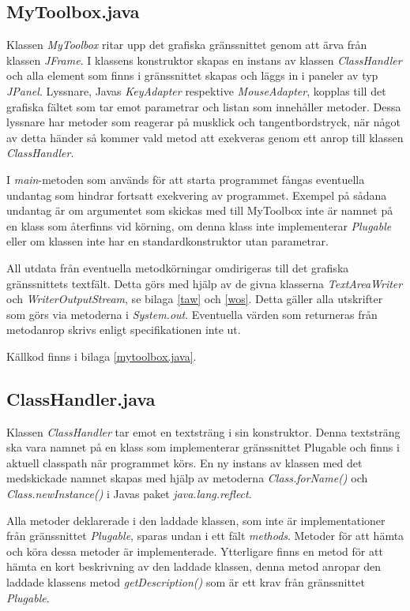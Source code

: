 \documentclass[a4paper, 12pt]{article}
\begin{document}
\subsection{MyToolbox.java}
Klassen \textit{MyToolbox} ritar upp det grafiska gränssnittet genom
att ärva från klassen \textit{JFrame}. I klassens konstruktor skapas
en instans av klassen \textit{ClassHandler} och alla element som finns
i gränssnittet skapas och läggs in i paneler av typ
\textit{JPanel}. Lyssnare, Javas \textit{KeyAdapter} respektive
\textit{MouseAdapter}, kopplas till det grafiska fältet som tar emot
parametrar och listan som innehåller metoder. Dessa lyssnare har
metoder som reagerar på musklick och tangentbordstryck, när något av
detta händer så kommer vald metod att exekveras genom ett anrop till
klassen \textit{ClassHandler}.

I \textit{main}-metoden som används för att starta programmet fångas
eventuella undantag som hindrar fortsatt exekvering av
programmet. Exempel på sådana undantag är om argumentet som skickas
med till MyToolbox inte är namnet på en klass som återfinns vid
körning, om denna klass inte implementerar \textit{Plugable} eller om
klassen inte har en standardkonstruktor utan parametrar.

All utdata från eventuella metodkörningar omdirigeras till det
grafiska gräns\-snittets textfält. Detta görs med hjälp av de givna
klasserna \textit{TextAreaWriter} och \textit{WriterOutputStream}, se
bilaga \ref{taw} och \ref{wos}. Detta gäller alla utskrifter som görs
via metoderna i \textit{System.out}. Eventuella värden som returneras
från metodanrop skrivs enligt specifikationen inte ut.

Källkod finns i bilaga \ref{mytoolbox.java}.

\subsection{ClassHandler.java}
Klassen \textit{ClassHandler} tar emot en textsträng i sin
konstruktor. Denna textsträng ska vara namnet på en klass som
implementerar gränssnittet Plugable och finns i aktuell classpath när
programmet körs. En ny instans av klassen med det medskickade namnet
skapas med hjälp av metoderna \textit{Class.forName()} och
\textit{Class.newInstance()} i Javas paket \textit{java.lang.reflect}.

Alla metoder deklarerade i den laddade klassen, som inte är
implementationer från gränssnittet \textit{Plugable}, sparas undan i ett
fält \textit{methods}. Metoder för att hämta och köra dessa metoder är
implementerade. Ytterligare finns en metod för att hämta en kort
beskrivning av den laddade klassen, denna metod anropar den laddade
klassens metod \textit{getDescription()} som är ett krav från
gränssnittet \textit{Plugable}.
\end{document}
